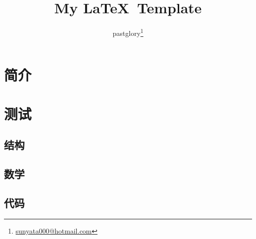\documentclass[zh, a4paper, 12pt]{pgreport}
\title {My \LaTeX\ Template}
\author{pastglory\thanks{\href{mailto:sunyata000@hotmail.com}{sunyata000@hotmail.com}}}
\date{}
\begin{document}
\maketitle
\tableofcontents
\begin{abstract}

\end{abstract}

\section{简介}


\section{测试}

\subsection{结构}


\subsection{数学}
%
\subsection{代码}



\end{document}
